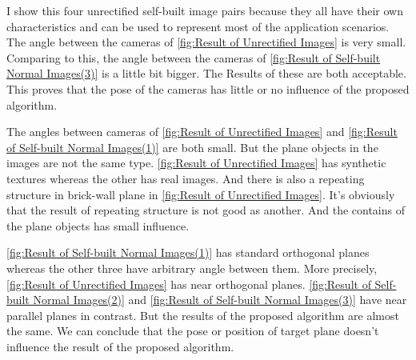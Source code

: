 I show this four unrectified self-built image pairs because they all have their own characteristics and can be used to represent most of the application scenarios. The angle between the cameras of \cref{fig:Result of Unrectified Images} is very small. Comparing to this, the angle between the cameras of \cref{fig:Result of Self-built Normal Images(3)} is a little bit bigger. The Results of these are both acceptable. This proves that the pose of the cameras has little or no influence of the proposed algorithm.

The angles between cameras of \cref{fig:Result of Unrectified Images} and \cref{fig:Result of Self-built Normal Images(1)} are both small. But the plane objects in the images are not the same type. \cref{fig:Result of Unrectified Images} has synthetic textures whereas the other has real images. And there is also a repeating structure in brick-wall plane in \cref{fig:Result of Unrectified Images}. It's obviously that the result of repeating structure is not good as another. And the contains of the plane objects has small influence.

\cref{fig:Result of Self-built Normal Images(1)} has standard orthogonal planes whereas the other three have arbitrary angle between them. More precisely,  \cref{fig:Result of Unrectified Images} has near orthogonal planes. \cref{fig:Result of Self-built Normal Images(2)} and \cref{fig:Result of Self-built Normal Images(3)} have near parallel planes in contrast. But the results of the proposed algorithm are almost the same. We can conclude that the pose or position of target plane doesn't influence the result of the proposed algorithm.


